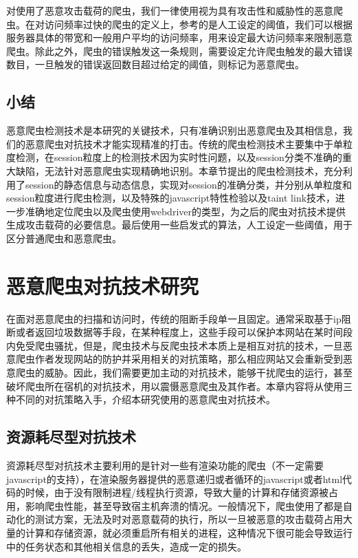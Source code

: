 \documentclass[doctor,privacy,twoside]{buaa_mac}
\begin{document}
对使用了恶意攻击载荷的爬虫，我们一律使用视为具有攻击性和威胁性的恶意爬虫。在对访问频率过快的爬虫的定义上，参考的是人工设定的阈值，我们可以根据服务器具体的带宽和一般用户平均的访问频率，用来设定最大访问频率来限制恶意爬虫。除此之外，爬虫的错误触发这一条规则，需要设定允许爬虫触发的最大错误数目，一旦触发的错误返回数目超过给定的阈值，则标记为恶意爬虫。


\section{小结}
恶意爬虫检测技术是本研究的关键技术，只有准确识别出恶意爬虫及其相信息，我们的恶意爬虫对抗技术才能实现精准的打击。传统的爬虫检测技术主要集中于单粒度检测，在session粒度上的检测技术因为实时性问题，以及session分类不准确的重大缺陷，无法针对恶意爬虫实现精确地识别。本章节提出的爬虫检测技术，充分利用了session的静态信息与动态信息，实现对session的准确分类，并分别从单粒度和session粒度进行爬虫检测，以及特殊的javascript特性检验以及taint link技术，进一步准确地定位爬虫以及爬虫使用webdriver的类型，为之后的爬虫对抗技术提供生成攻击载荷的必要信息。最后使用一些启发式的算法，人工设定一些阈值，用于区分普通爬虫和恶意爬虫。


\chapter{恶意爬虫对抗技术研究}

在面对恶意爬虫的扫描和访问时，传统的阻断手段单一且固定。通常采取基于ip阻断或者返回垃圾数据等手段，在某种程度上，这些手段可以保护本网站在某时间段内免受爬虫骚扰，但是，爬虫技术与反爬虫技术本质上是相互对抗的技术，一旦恶意爬虫作者发现网站的防护并采用相关的对抗策略，那么相应网站又会重新受到恶意爬虫的威胁。因此，我们需要更加主动的对抗技术，能够干扰爬虫的运行，甚至破坏爬虫所在宿机的对抗技术，用以震慑恶意爬虫及其作者。本章内容将从使用三种不同的对抗策略入手，介绍本研究使用的恶意爬虫对抗技术。

\section{资源耗尽型对抗技术}
资源耗尽型对抗技术主要利用的是针对一些有渲染功能的爬虫（不一定需要javascript的支持），在渲染服务器提供的恶意递归或者循环的javascript或者html代码的时候，由于没有限制进程/线程执行资源，导致大量的计算和存储资源被占用，影响爬虫性能，甚至导致宿主机奔溃的情况。一般情况下，爬虫使用了都是自动化的测试方案，无法及时对恶意载荷的执行，所以一旦被恶意的攻击载荷占用大量的计算和存储资源，就必须重启所有相关的进程，这种情况下很可能会导致运行中的任务状态和其他相关信息的丢失，造成一定的损失。
\end{document}

